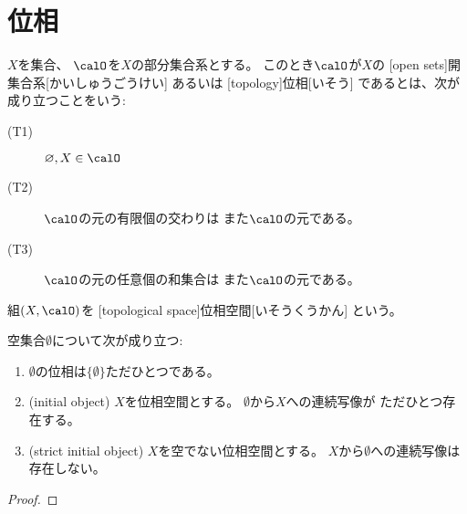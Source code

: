 \documentclass[report]{jlreq}
\begin{document}
%
\chapter{位相}

\begin{definition}[位相空間]
    $X$を集合、
    $\calO$を$X$の部分集合系とする。
    このとき$\calO$が$X$の
    [open sets]{開集合系}[かいしゅうごうけい]
    あるいは
    [topology]{位相}[いそう]
    であるとは、次が成り立つことをいう:
    \begin{description}
        \item[(T1)] $\emptyset, X \in \calO$
        \item[(T2)] $\calO$の元の有限個の交わりは
            また$\calO$の元である。
        \item[(T3)] $\calO$の元の任意個の和集合は
            また$\calO$の元である。
    \end{description}
    組$(X, \calO)$を
    [topological space]{位相空間}[いそうくうかん]
    という。
\end{definition}

\begin{proposition}[位相空間としての空集合]
    空集合$\emptyset$について次が成り立つ:
    \begin{enumerate}
        \item $\emptyset$の位相は$\{ \emptyset \}$ただひとつである。
        \item (initial object) $X$を位相空間とする。
            $\emptyset$から$X$への連続写像が
            ただひとつ存在する。
        \item (strict initial object) $X$を空でない位相空間とする。
            $X$から$\emptyset$への連続写像は存在しない。
    \end{enumerate}
\end{proposition}

\begin{proof}
    \TODO{}
\end{proof}
\end{document}
